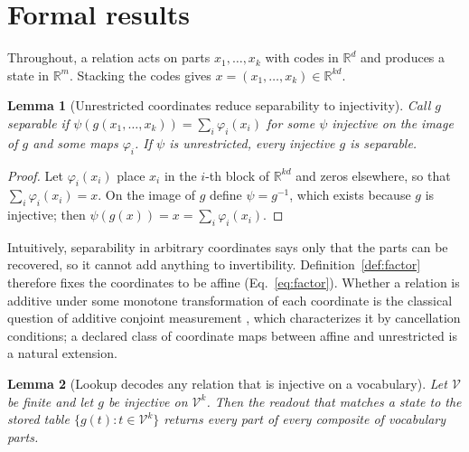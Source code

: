 \documentclass[10pt]{article}
\theoremstyle{plain}
\newtheorem{lemma}{Lemma}
\theoremstyle{remark}
\newcommand{\R}{\mathbb{R}}
\newcommand{\Voc}{\mathcal{V}}
\begin{document}
\FloatBarrier



\clearpage
\appendix
\makeatletter\let\@fb@secFB\relax\makeatother %

\section{Formal results}
\label{app:proofs}

Throughout, a relation acts on parts $x_1, \ldots, x_k$ with codes in $\R^d$ and produces a state in $\R^m$. Stacking the codes gives $x = (x_1, \ldots, x_k) \in \R^{kd}$.



\begin{lemma}[Unrestricted coordinates reduce separability to injectivity]
\label{lem:psi}
Call $g$ separable if $\psi(g(x_1, \ldots, x_k)) = \sum_i \varphi_i(x_i)$ for some $\psi$ injective on the image of $g$ and some maps $\varphi_i$. If $\psi$ is unrestricted, every injective $g$ is separable.
\end{lemma}

\begin{proof}
Let $\varphi_i(x_i)$ place $x_i$ in the $i$-th block of $\R^{kd}$ and zeros elsewhere, so that $\sum_i \varphi_i(x_i) = x$. On the image of $g$ define $\psi = g^{-1}$, which exists because $g$ is injective; then $\psi(g(x)) = x = \sum_i \varphi_i(x_i)$.
\end{proof}

\noindent
Intuitively, separability in arbitrary coordinates says only that the parts can be recovered, so it cannot add anything to invertibility. Definition~\ref{def:factor} therefore fixes the coordinates to be affine (Eq.~\ref{eq:factor}). Whether a relation is additive under some monotone transformation of each coordinate is the classical question of additive conjoint measurement \citep{luce1964}, which characterizes it by cancellation conditions; a declared class of coordinate maps between affine and unrestricted is a natural extension.

\begin{lemma}[Lookup decodes any relation that is injective on a vocabulary]
\label{lem:lookup}
Let $\Voc$ be finite and let $g$ be injective on $\Voc^k$. Then the readout that matches a state to the stored table $\{g(t) : t \in \Voc^k\}$ returns every part of every composite of vocabulary parts.
\end{lemma}
\end{document}
